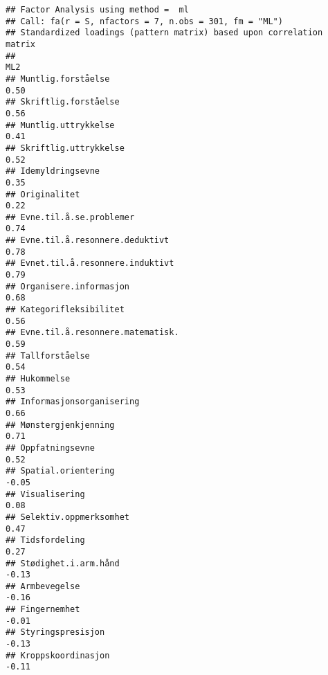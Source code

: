 \documentclass[
]{article}
\begin{document}
\begin{verbatim}
## Factor Analysis using method =  ml
## Call: fa(r = S, nfactors = 7, n.obs = 301, fm = "ML")
## Standardized loadings (pattern matrix) based upon correlation matrix
##                                                                                    ML2
## Muntlig.forståelse                                                                0.50
## Skriftlig.forståelse                                                              0.56
## Muntlig.uttrykkelse                                                               0.41
## Skriftlig.uttrykkelse                                                             0.52
## Idemyldringsevne                                                                  0.35
## Originalitet                                                                      0.22
## Evne.til.å.se.problemer                                                           0.74
## Evne.til.å.resonnere.deduktivt                                                    0.78
## Evnet.til.å.resonnere.induktivt                                                   0.79
## Organisere.informasjon                                                            0.68
## Kategorifleksibilitet                                                             0.56
## Evne.til.å.resonnere.matematisk.                                                  0.59
## Tallforståelse                                                                    0.54
## Hukommelse                                                                        0.53
## Informasjonsorganisering                                                          0.66
## Mønstergjenkjenning                                                               0.71
## Oppfatningsevne                                                                   0.52
## Spatial.orientering                                                              -0.05
## Visualisering                                                                     0.08
## Selektiv.oppmerksomhet                                                            0.47
## Tidsfordeling                                                                     0.27
## Stødighet.i.arm.hånd                                                             -0.13
## Armbevegelse                                                                     -0.16
## Fingernemhet                                                                     -0.01
## Styringspresisjon                                                                -0.13
## Kroppskoordinasjon                                                               -0.11

\end{verbatim}
\end{document}
